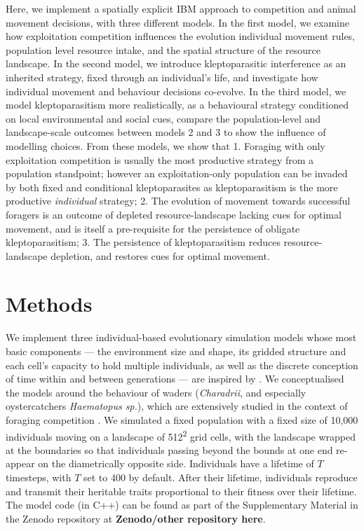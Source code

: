 \documentclass[11pt]{article}
\begin{document}
Here, we implement a spatially explicit IBM approach to competition and animal movement decisions, with three different models.
In the first model, we examine how exploitation competition influences the evolution individual movement rules, population level resource intake, and the spatial structure of the resource landscape.
In the second model, we introduce kleptoparasitic interference as an inherited strategy, fixed through an individual's life, and investigate how individual movement and behaviour decisions co-evolve.
In the third model, we model kleptoparasitism more realistically, as a behavioural strategy conditioned on local environmental and social cues, compare the population-level and landscape-scale outcomes between models 2 and 3 to show the influence of modelling choices.
From these models, we show that 1. Foraging with only exploitation competition is usually the most productive strategy from a population standpoint; however an exploitation-only population can be invaded by both fixed and conditional kleptoparasites as kleptoparasitism is the more productive \textit{individual} strategy;
2. The evolution of movement towards successful foragers is an outcome of depleted resource-landscape lacking cues for optimal movement, and is itself a pre-requisite for the persistence of obligate kleptoparasitism;
3. The persistence of kleptoparasitism reduces resource-landscape depletion, and restores cues for optimal movement. 

\section{Methods}

We implement three individual-based evolutionary simulation models whose most basic components --- the environment size and shape, its gridded structure and each cell's capacity to hold multiple individuals, as well as the discrete conception of time within and between generations --- are inspired by \citet{netz2020}.
We conceptualised the models around the behaviour of waders (\textit{Charadrii}, and especially oystercatchers \textit{Haematopus sp.}), which are extensively studied in the context of foraging competition \citep[e.g.][]{vahl2005, vahl2005b, vahl2007, ENS1990219, rutten2010a, rutten2010}.
We simulated a fixed population with a fixed size of 10,000 individuals moving on a landscape of 512\textsuperscript{2} grid cells, with the landscape wrapped at the boundaries so that individuals passing beyond the bounds at one end re-appear on the diametrically opposite side.
Individuals have a lifetime of $T$ timesteps, with $T$ set to 400 by default.
After their lifetime, individuals reproduce and transmit their heritable traits proportional to their fitness over their lifetime.
The model code (in C++) can be found as part of the Supplementary Material in the Zenodo repository at \textbf{Zenodo/other repository here}.
\end{document}

